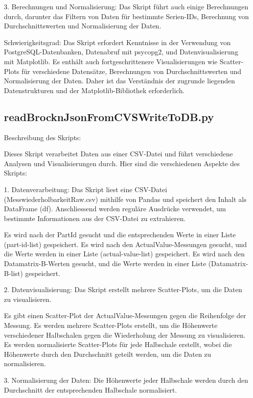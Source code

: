 3. Berechnungen und Normalisierung:
Das Skript führt auch einige Berechnungen durch, darunter das Filtern von Daten für bestimmte Serien-IDs, Berechnung von Durchschnittswerten und Normalisierung der Daten.

Schwierigkeitsgrad:
Das Skript erfordert Kenntnisse in der Verwendung von PostgreSQL-Datenbanken, Datenabruf mit psycopg2, und Datenvisualisierung mit Matplotlib. Es enthält auch fortgeschrittenere Visualisierungen wie Scatter-Plots für verschiedene Datensätze, Berechnungen von Durchschnittswerten und Normalisierung der Daten. Daher ist das Verständnis der zugrunde liegenden Datenstrukturen und der Matplotlib-Bibliothek erforderlich.

\subsection{readBrocknJsonFromCVSWriteToDB.py}
Beschreibung des Skripts:

Dieses Skript verarbeitet Daten aus einer CSV-Datei und führt verschiedene Analysen und Visualisierungen durch. Hier sind die verschiedenen Aspekte des Skripts:

1. Datenverarbeitung:
Das Skript liest eine CSV-Datei (MesswiederholbarkeitRaw.csv) mithilfe von Pandas und speichert den Inhalt als DataFrame (df). Anschliessend werden reguläre Ausdrücke verwendet, um bestimmte Informationen aus der CSV-Datei zu extrahieren.

    Es wird nach der PartId gesucht und die entsprechenden Werte in einer Liste (part-id-list) gespeichert.
    Es wird nach den ActualValue-Messungen gesucht, und die Werte werden in einer Liste (actual-value-list) gespeichert.
    Es wird nach den Datamatrix-B-Werten gesucht, und die Werte werden in einer Liste (Datamatrix-B-list) gespeichert.

2. Datenvisualisierung:
Das Skript erstellt mehrere Scatter-Plots, um die Daten zu visualisieren.

    Es gibt einen Scatter-Plot der ActualValue-Messungen gegen die Reihenfolge der Messung.
    Es werden mehrere Scatter-Plots erstellt, um die Höhenwerte verschiedener Halbschalen gegen die Wiederholung der Messung zu visualisieren.
    Es werden normalisierte Scatter-Plots für jede Halbschale erstellt, wobei die Höhenwerte durch den Durchschnitt geteilt werden, um die Daten zu normalisieren.

3. Normalisierung der Daten:
Die Höhenwerte jeder Halbschale werden durch den Durchschnitt der entsprechenden Halbschale normalisiert.

